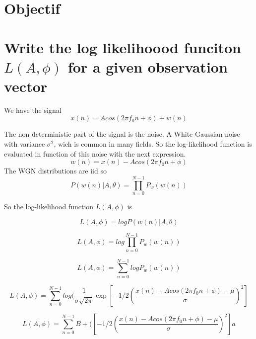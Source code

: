 \documentclass{report}
\begin{document}
\section{Objectif}



\section{Write the log likelihoood funciton $L(A,\phi)$ for a given observation vector}
\label{estimationProblem}

We have the signal 
\begin{equation}\label{key}
x(n) = A cos (2\pi f_0 n + \phi) + w(n)
\end{equation}

The non deterministic part of the signal is the noise. A White Gaussian noise with variance $\sigma ^2$, wich is common in many fields. So the log-likelihood function is evaluated in function of this noise with the next expression.
\begin{equation}\label{key}
w(n) = x(n) - A cos (2\pi f_0 n + \phi)
\end{equation}
The WGN distributions are iid so 
\begin{equation}\label{key}
P(w(n)|A,\theta ) = \prod_{n=0}^{N-1} P_w(w(n))
\end{equation}

So the log-likelihood function $L(A,\phi)$ is 

\begin{equation}\label{key}
L(A,\phi) = log P(w(n)|A,\theta )
\end{equation}

\begin{equation}\label{key}
L(A,\phi) = log \prod_{n=0}^{N-1} P_w(w(n))
\end{equation}

\begin{equation}\label{key}
L(A,\phi) = \sum_{n=0}^{N-1} log P_w(w(n))
\end{equation}

\begin{equation}\label{key}
L(A,\phi) = \sum_{n=0}^{N-1} log(\frac{1}{\sigma \sqrt{2\pi}}\exp{[-1/2(\frac{x(n) - A cos (2\pi f_0 n + \phi)-\mu}{\sigma})^2]}
\end{equation}

\begin{equation}\label{key}
L(A,\phi) = \sum_{n=0}^{N-1} B + ({[-1/2(\frac{x(n) - A cos (2\pi f_0 n + \phi)-\mu}{\sigma})^2]}a
\end{equation}
\end{document}
